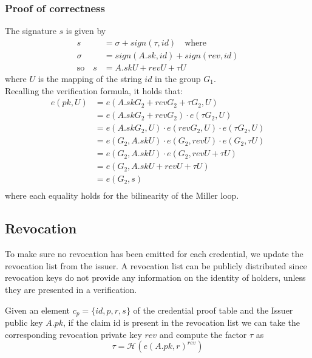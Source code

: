 \documentclass[conference]{IEEEtran}
\begin{document}
\subsubsection{Proof of correctness}
The signature $s$ is given by
\begin{equation*}
\begin{split}
    s &= \sigma + sign(\tau, id) \quad \text{where} \\
    \sigma &= sign(A.sk, id) + sign(rev, id) \\
    \text{so} \quad s &= A.sk U + rev U + \tau U
\end{split}
\end{equation*}
where $U$ is the mapping of the string $id$ in the group $G_1$.\\
Recalling the verification formula, it holds that:
\begin{equation*}
\begin{split}
 e(pk, U) &= e(A.skG_2 + revG_2 + \tau G_2, U) \\
 &= e(A.skG_2 + revG_2)\cdot e(\tau G_2, U) \\
 &= e(A.skG_2, U) \cdot e(revG_2, U) \cdot e(\tau G_2, U) \\
 &= e(G_2, A.sk U) \cdot e(G_2, rev U) \cdot e(G_2, \tau U) \\
 &= e(G_2, A.sk U) \cdot e(G_2, rev U + \tau U) \\
 &= e(G_2, A.sk U + rev U + \tau U) \\
 &= e(G_2, s) \\
\end{split}
\end{equation*}
where each equality holds for the bilinearity of the Miller loop.

\subsection{Revocation}

To make sure no revocation has been emitted for each credential, we update the revocation list from the issuer. A revocation list can be publicly distributed since revocation keys do not provide any information on the identity of holders, unless they are presented in a verification.

Given an element $c_p = \{id, p, r, s \}$ of the credential proof table and the Issuer public key $A.pk$, if the claim id is present in the revocation list we can take the corresponding revocation private key $rev$ and compute the factor $\tau$ as
\begin{equation}\label{tau}
        \tau = \mathcal{H}(e(A.pk, r)^{rev})
\end{equation}
\end{document}
